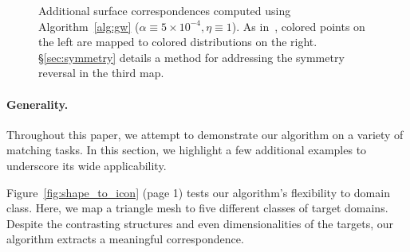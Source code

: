 \begin{figure}
{\!}
\caption{Additional surface correspondences computed using Algorithm~\protect\ref{alg:gw} ($\alpha\!\equiv\!5\!\times\!10^{-4},\eta\!\equiv\!1$).  As in~\protect\cite{solomon-2015},  colored points on the left are mapped to colored distributions on the right.  \S\ref{sec:symmetry} details a method for addressing the symmetry reversal in the third map.\vspace{-.15in}}\label{fig:more_maps}
\end{figure}

\paragraph*{Generality.} Throughout this paper, we attempt to demonstrate our algorithm on a variety of matching tasks.  In this section, we highlight a few additional examples to underscore its wide applicability.

Figure~\ref{fig:shape_to_icon} (page 1) tests our algorithm's flexibility to domain class.  Here, we map a triangle mesh to five different classes of target domains.  Despite the contrasting structures and even dimensionalities of the targets, our algorithm extracts a meaningful correspondence.

